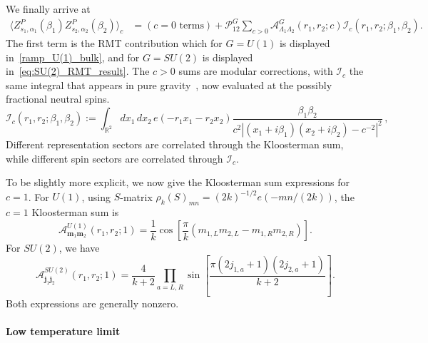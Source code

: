 \documentclass[11pt]{article}
\numberwithin{equation}{section}
\begin{document}
We finally arrive at
\begin{equation}
\begin{aligned}
 \langle Z^P_{s_1,\alpha_1}(\beta_1)Z^P_{s_2,\alpha_2}(\beta_2)\rangle_c
 &=(c=0\text{ terms})+\mathcal P^G_{12}\sum_{c>0}
 \mathcal A^G_{\Lambda_1\Lambda_2}(r_1,r_2;c)
 \mathcal I_c(r_1,r_2;\beta_1,\beta_2).
\end{aligned}
\label{WH_amp_result_prime}
\end{equation}
The first term is the RMT contribution which for $G=U(1)$ is displayed in~\eqref{ramp_U(1)_bulk}, and for $G=SU(2)$ is displayed in~\eqref{eq:SU(2)_RMT_result}. The $c>0$ sums are modular corrections, with $\mathcal I_c$  the same integral that appears in pure gravity~\cite{Cotler:2020ugk}, now evaluated at the possibly fractional neutral spins.
\begin{equation}
\mathcal I_c(r_1,r_2;\beta_1,\beta_2)
 :=\int_{\mathbb R^2}dx_1\,dx_2\,
 e(-r_1x_1-r_2x_2)
 \frac{\beta_1\beta_2}
 {c^2\left|(x_1+i\beta_1)(x_2+i\beta_2)-c^{-2}\right|^2}\,,
\label{eq:continuous-gravitational-integral}
\end{equation}
Different representation sectors are correlated through the Kloosterman sum, while different spin sectors are correlated through $\mathcal I_c$.  



To be slightly more explicit, we now give the Kloosterman sum expressions for $c=1$. For $U(1)$, using $S$-matrix $\rho_k(S)_{mn}=(2k)^{-1/2}e(-mn/(2k))$, the $c=1$ Kloosterman sum is
\begin{equation}
\mathcal A^{U(1)}_{\mathbf m_1\mathbf m_2}(r_1,r_2;1)
 =\frac1k\cos\!\left[\frac\pi k
 (m_{1,L}m_{2,L}-m_{1,R}m_{2,R})\right].
\label{eq:U1-c1-correction}
\end{equation}
For $SU(2)$, we have
\begin{equation}
\mathcal A^{SU(2)}_{\mathbf j_1\mathbf j_2}(r_1,r_2;1)
 =\frac{4}{k+2}\prod_{a=L,R}
 \sin\!\left[\frac{\pi(2j_{1,a}+1)(2j_{2,a}+1)}{k+2}\right].
\label{eq:SU2-c1-correction}
\end{equation}
Both expressions are generally nonzero.




\paragraph{Low temperature limit}
\end{document}
